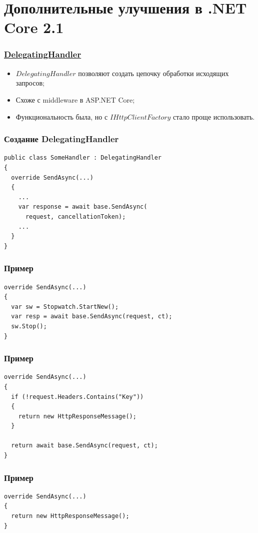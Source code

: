 \documentclass[17pt,aspectratio=169]{beamer}
\begin{document}
\section{Дополнительные улучшения в .NET Core 2.1}
\begin{frame}
\frametitle{\href{https://docs.microsoft.com/en-us/dotnet/api/system.net.http.delegatinghandler?view=netcore-2.2}{DelegatingHandler}}
\begin{itemize}
	\item <1-> $DelegatingHandler$ позволяют создать цепочку обработки исходящих запросов;
	\item <2-> Схоже с middleware в ASP.NET Core;
	\item <3-> Функциональность была, но с $IHttpClientFactory$ стало проще использовать.
\end{itemize}
\end{frame}

\begin{frame}[fragile]
\frametitle{Создание DelegatingHandler}
\begin{lstlisting}
public class SomeHandler : DelegatingHandler
{
  override SendAsync(...)
  {
    ...
    var response = await base.SendAsync(
      request, cancellationToken);
    ...
  }
}     
\end{lstlisting}
\end{frame}

\begin{frame}[fragile]
\frametitle{Пример}
\begin{lstlisting}
override SendAsync(...)
{
  var sw = Stopwatch.StartNew();
  var resp = await base.SendAsync(request, ct);
  sw.Stop();
}     
\end{lstlisting}
\end{frame}

\begin{frame}[fragile]
\frametitle{Пример}
\begin{lstlisting}
override SendAsync(...)
{
  if (!request.Headers.Contains("Key"))
  {
    return new HttpResponseMessage();
  }
  
  return await base.SendAsync(request, ct);
}     
\end{lstlisting}
\end{frame}

\begin{frame}[fragile]
\frametitle{Пример}
\begin{lstlisting}
override SendAsync(...)
{
  return new HttpResponseMessage();
}     
\end{lstlisting}
\end{frame}
\end{document}
